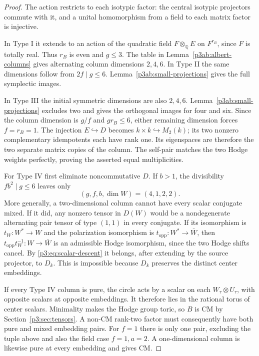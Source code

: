 \documentclass[11pt]{article}
\newcommand{\Q}{\mathbb Q}
\numberwithin{equation}{section}
\begin{document}
\begin{proof}
The action restricts to each isotypic factor: the central isotypic
projectors commute with it, and a unital homomorphism from a field
to each matrix factor is injective.

In Type I it extends to an action of the quadratic field
\(F\otimes_\Q E\) on \(F^{r_B}\), since \(F\) is totally real.
Thus \(r_B\) is even and \(g\leq3\).  The table in
Lemma~\ref{p3ab:albert-columns} gives alternating column
dimensions \(2,4,6\).  In Type II the same dimensions follow
from \(2f\mid g\leq6\).  Lemma~\ref{p3ab:small-projections}
gives the full symplectic images.

In Type III the initial symmetric dimensions are also \(2,4,6\).
Lemma~\ref{p3ab:small-projections} excludes two and gives the
orthogonal images for four and six.  Since the column dimension
is \(g/f\) and \(gr_B\leq6\), either remaining dimension forces
\(f=r_B=1\).  The injection \(E\hookrightarrow D\) becomes
\(k\times k\hookrightarrow M_2(k)\); its two nonzero
complementary idempotents each have rank one.  Its eigenspaces
are therefore the two separate matrix copies of the column.
The self-pair matches the two Hodge weights perfectly, proving
the asserted equal multiplicities.

For Type IV first eliminate noncommutative \(D\).  If \(b>1\),
the divisibility \(fb^2\mid g\leq6\) leaves only
\[
 (g,f,b,\dim W)=(4,1,2,2).
\]
More generally, a two-dimensional column cannot have every scalar
conjugate mixed.  If it did, any nonzero tensor in \(D(W)\)
would be a nondegenerate alternating pair tensor of type
\((1,1)\) in every conjugate.  If its isomorphism is
\(t_W:W^*\to W\) and the polarization isomorphism is
\(t_{\mathrm{opp}}:W^*\to\bar W\), then
\(t_{\mathrm{opp}}t_W^{-1}:W\to\bar W\) is an
admissible Hodge isomorphism, since the two Hodge shifts cancel.
By \eqref{p3:eq:scalar-descent} it belongs, after extending by
the source projector, to \(D_k\).  This is impossible because
\(D_k\) preserves the distinct center embeddings.

If every Type IV column is pure, the circle acts by a scalar on
each \(W_\tau\otimes U_\tau\), with opposite scalars at opposite
embeddings.  It therefore lies in the rational torus of center
scalars.  Minimality makes the Hodge group toric, so \(B\) is
CM by Section~\ref{p3:sec:tensors}.  A non-CM rank-two factor
must consequently have both pure and mixed embedding pairs.  For
\(f=1\) there is only one pair, excluding the tuple above and
also the field case \(f=1,a=2\).  A one-dimensional column is
likewise pure at every embedding and gives CM.


\end{proof}
\end{document}
